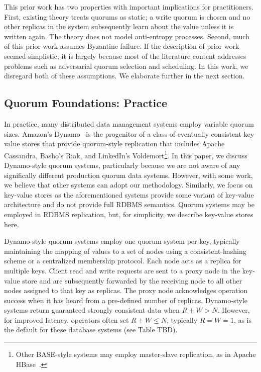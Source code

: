 \documentclass{vldb}
\begin{document}
This prior work has two properties with important implications for
practitioners.  First, existing theory treats quorums as static; a
write quorum is chosen and no other replicas in the system
subsequently learn about the value unless it is written again.  The
theory does not model anti-entropy processes.  Second, much of this
prior work assumes Byzantine failure.  If the description of prior
work seemed simplistic, it is largely because most of the literature
content addresses problems such as adversarial quorum selection and
scheduling.  In this work, we disregard both of these assumptions.  We
elaborate further in the next section.

\subsection{Quorum Foundations: Practice}
\label{sec:practice}

In practice, many distributed data management systems employ variable
quorum sizes. Amazon's Dynamo~\cite{dynamo} is the progenitor of a
class of eventually-consistent key-value stores that provide
quorum-style replication that includes Apache Cassandra, Basho's Riak,
and LinkedIn's Voldemort\footnote{Other BASE-style systems may employ
  master-slave replication, as in Apache HBase~\cite{hbase}.}.  In
this paper, we discuss Dynamo-style quorum systems, particularly
because we are not aware of any significally different production
quorum data systems.  However, with some work, we believe that other
systems can adopt our methodology.  Similarly, we focus on key-value
stores as the aforementioned systems provide some variant of key-value
architecture and do not provide full RDBMS semantics.  Quorum systems
may be employed in RDBMS replication, but, for simplicity, we describe
key-value stores here.

Dynamo-style quorum systems employ one quorum system per key,
typically maintaining the mapping of values to a set of nodes using a
consistent-hashing scheme or a centralized membership protocol. Each
node acts as a replica for multiple keys.  Client read and write
requests are sent to a proxy node in the key-value store and are
subsequently forwarded by the receiving node to all other nodes
assigned to that key as replicas.  The proxy node acknowledges
operation success when it has heard from a pre-defined number of
replicas.  Dynamo-style systems return guaranteed strongly consistent
data when $R+W > N$.  However, for improved latency, operators often
set $R+W \leq N$, typically $R=W=1$, as is the default for these
database systems (see Table TBD).
\end{document}
